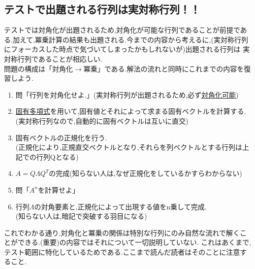 \subsection{テストで出題される行列は実対称行列！！}
テストでは対角化が出題されるため,対角化が可能な行列であることが前提である.加えて,冪乗計算の結果も出題される.今までの内容から考えるに,(実対称行列にフォーカスした時点で気づいてしまったかもしれないが)出題される行列は
実対称行列であることが相応しい.\\問題の構成は「対角化$\to$冪乗」である.解法の流れと同時にこれまでの内容を復習しよう.
\begin{framed}
\begin{enumerate}
    \item 問「行列を対角化せよ.」(実対称行列が出題されるため,必ず\hyperlink{parametric}{対角化可能})
    \item \hyperlink{eig}{固有多項式}を用いて,固有値とそれによって求まる固有ベクトルを計算する.\\(実対称行列なので,自動的に固有ベクトルは互いに直交)
    \item 固有ベクトルの正規化を行う.\\(正規化により,正規直交ベクトルとなり,それらを列ベクトルとする行列は上記での行列Qとなる)
    \item $A=Q\Lambda Q^T$の完成\;(知らない人は,なぜ正規化をしているかすらわからない)
    \item 問「$A^n$を計算せよ」
    \item 行列$\Lambda$の対角要素と,正規化によって出現する値をn乗して完成.\\(知らない人は,暗記で突破する羽目になる)
\end{enumerate}
\end{framed}
これでわかる通り,対角化と冪乗の関係は特別な行列にのみ自然な流れで解くことができる.(重要)の内容ではそれについて一切説明していない.
これはあくまで,テスト範囲に特化しているためである.ここまで読んだ読者はそのことに注意すること.

